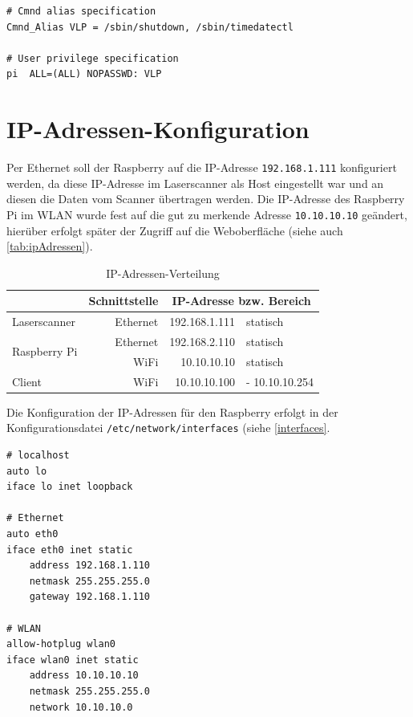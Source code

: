 \documentclass[a4paper,12pt,bibliography=totoc, listof=totoc,titlepage,pointlessnumbers]{scrreprt}
\newcommand{\code}[1]{\texttt{#1}}
\begin{document}
\begin{lstlisting}[caption={Änderung der \code{/etc/sudoers}}, label={Lsudoers}]
# Cmnd alias specification
Cmnd_Alias VLP = /sbin/shutdown, /sbin/timedatectl

# User privilege specification
pi	ALL=(ALL) NOPASSWD: VLP
\end{lstlisting}

\section{IP-Adressen-Konfiguration}
Per Ethernet soll der Raspberry auf die IP-Adresse \code{192.168.1.111} konfiguriert werden, da diese IP-Adresse im Laserscanner als Host eingestellt war und an diesen die Daten vom Scanner übertragen werden. Die IP-Adresse des Raspberry Pi im WLAN wurde fest auf die gut zu merkende Adresse \code{10.10.10.10} geändert, hierüber erfolgt später der Zugriff auf die Weboberfläche (siehe auch \autoref{tab:ipAdressen}).

\begin{table}
\centering
\begin{tabular}{l|r|r|l|}
\cline{2-4}
                                                    & Schnittstelle & \multicolumn{2}{c|}{IP-Adresse bzw. Bereich} \\ \hline
\multicolumn{1}{|l|}{Laserscanner}                  & Ethernet      & 192.168.1.111        & statisch              \\ \hline
\multicolumn{1}{|l|}{\multirow{2}{*}{Raspberry Pi}} & Ethernet      & 192.168.2.110        & statisch              \\ \cline{2-4} 
\multicolumn{1}{|l|}{}                              & WiFi          & 10.10.10.10          & statisch              \\ \hline
\multicolumn{1}{|l|}{Client}                        & WiFi          & 10.10.10.100         & - 10.10.10.254        \\ \hline
\end{tabular}
\caption{IP-Adressen-Verteilung}
\label{tab:ipAdressen}
\end{table}

Die Konfiguration der IP-Adressen für den Raspberry erfolgt in der Konfigurationsdatei \code{/etc/network/interfaces} (siehe \autoref{interfaces}. \cite{accesspoint}

\begin{lstlisting}[caption={Konfiguration der \code{/etc/network/interfaces}}, label={interfaces}]
# localhost
auto lo
iface lo inet loopback

# Ethernet
auto eth0
iface eth0 inet static
	address 192.168.1.110
	netmask 255.255.255.0
	gateway 192.168.1.110

# WLAN
allow-hotplug wlan0
iface wlan0 inet static
	address 10.10.10.10
	netmask 255.255.255.0
	network 10.10.10.0
\end{lstlisting}
\end{document}
